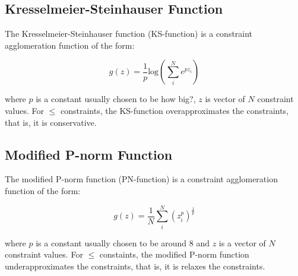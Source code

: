 \documentclass{article}
\begin{document}
\subsection{Kresselmeier-Steinhauser Function}

The Kresselmeier-Steinhauser function (KS-function) is a constraint agglomeration function of the form:

\begin{equation}
\label{eq:ks_function}
g(z) = \frac{1}{p} \textrm{log} \left( \sum_i^N e^{pz_i} \right)
\end{equation}

where $p$ is a constant usually chosen to be {\color{red}how big?}, $z$ is vector of $N$ constraint values. For $\leq$ constraints, the KS-function overapproximates the constraints, that is, it is conservative.

\subsection{Modified P-norm Function}

The modified P-norm function (PN-function) is a constraint agglomeration function of the form:

\begin{equation}
\label{eq:pn_function}
g(z) = \frac{1}{N} \sum_i^N \left( z_i^p \right)^{\frac{1}{p}}
\end{equation}

where $p$ is a constant usually chosen to be around 8 and $z$ is a vector of $N$ constraint values. For $\leq$ constaints, the modified P-norm function underapproximates the constraints, that is, it is relaxes the constraints.





\end{document}
